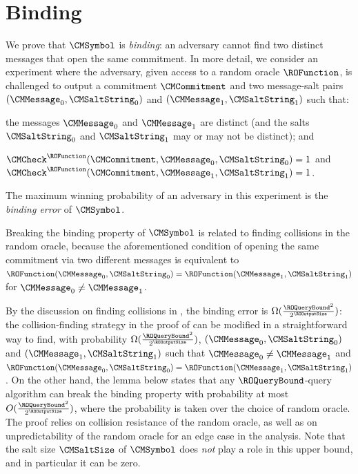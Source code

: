 \section{Binding}
\label{section:basic-commitment-binding}

We prove that $\CMSymbol$ is \emph{binding}: an adversary cannot find two distinct messages that open the same commitment. In more detail, we consider an experiment where the adversary, given access to a random oracle $\ROFunction$, is challenged to output a commitment $\CMCommitment$ and two message-salt pairs $(\CMMessage_{0},\CMSaltString_{0})$ and $(\CMMessage_{1},\CMSaltString_{1})$ such that:
\begin{inparaenum}[(i)]
  \item the messages $\CMMessage_{0}$ and $\CMMessage_{1}$ are distinct (and the salts $\CMSaltString_{0}$ and $\CMSaltString_{1}$ may or may not be distinct); and
  \item $\CMCheck^{\ROFunction}(\CMCommitment,\CMMessage_{0},\CMSaltString_{0})=1$ and $\CMCheck^{\ROFunction}(\CMCommitment,\CMMessage_{1},\CMSaltString_{1})=1$.
\end{inparaenum}
The maximum winning probability of an adversary in this experiment is the \emph{binding error} of $\CMSymbol$.

Breaking the binding property of $\CMSymbol$ is related to finding collisions in the random oracle, because the aforementioned condition of opening the same commitment via two different messages is equivalent to $\ROFunction(\CMMessage_{0},\CMSaltString_{0})=\ROFunction(\CMMessage_{1},\CMSaltString_{1})$ for $\CMMessage_{0} \neq \CMMessage_{1}$.

By the discussion on finding collisions in , the binding error is $\Omega(\frac{\ROQueryBound^2}{2^{\ROOutputSize}})$: the collision-finding strategy in the proof of  can be modified in a straightforward way to find, with probability $\Omega(\frac{\ROQueryBound^2}{2^{\ROOutputSize}})$, $(\CMMessage_{0},\CMSaltString_{0})$ and $(\CMMessage_{1},\CMSaltString_{1})$ such that $\CMMessage_{0} \neq \CMMessage_{1}$ and $\ROFunction(\CMMessage_{0},\CMSaltString_{0})=\ROFunction(\CMMessage_{1},\CMSaltString_{1})$. On the other hand, the lemma below states that any $\ROQueryBound$-query algorithm can break the binding property with probability at most $O(\frac{\ROQueryBound^2}{2^{\ROOutputSize}})$, where the probability is taken over the choice of random oracle. The proof relies on collision resistance of the random oracle, as well as on unpredictability of the random oracle for an edge case in the analysis. Note that the salt size $\CMSaltSize$ of $\CMSymbol$ does \emph{not} play a role in this upper bound, and in particular it can be zero.

